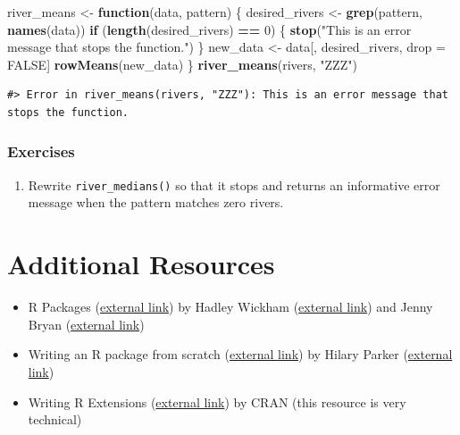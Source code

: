 \documentclass[
]{book}
\newenvironment{Shaded}{\begin{snugshade}}{\end{snugshade}}
\newcommand{\ControlFlowTok}[1]{\textcolor[rgb]{0.13,0.29,0.53}{\textbf{#1}}}
\newcommand{\DecValTok}[1]{\textcolor[rgb]{0.00,0.00,0.81}{#1}}
\newcommand{\KeywordTok}[1]{\textcolor[rgb]{0.13,0.29,0.53}{\textbf{#1}}}
\newcommand{\NormalTok}[1]{#1}
\newcommand{\OperatorTok}[1]{\textcolor[rgb]{0.81,0.36,0.00}{\textbf{#1}}}
\newcommand{\OtherTok}[1]{\textcolor[rgb]{0.56,0.35,0.01}{#1}}
\newcommand{\StringTok}[1]{\textcolor[rgb]{0.31,0.60,0.02}{#1}}
\providecommand{\tightlist}{%
  \setlength{\itemsep}{0pt}\setlength{\parskip}{0pt}}
\begin{document}
\begin{Shaded}
\begin{Highlighting}[]
\NormalTok{river_means <-}\StringTok{ }\ControlFlowTok{function}\NormalTok{(data, pattern) \{}
\NormalTok{  desired_rivers <-}\StringTok{ }\KeywordTok{grep}\NormalTok{(pattern, }\KeywordTok{names}\NormalTok{(data))}
  \ControlFlowTok{if}\NormalTok{ (}\KeywordTok{length}\NormalTok{(desired_rivers) }\OperatorTok{==}\StringTok{ }\DecValTok{0}\NormalTok{) \{}
    \KeywordTok{stop}\NormalTok{(}\StringTok{"This is an error message that stops the function."}\NormalTok{)}
\NormalTok{  \}}
\NormalTok{  new_data <-}\StringTok{ }\NormalTok{data[, desired_rivers, drop =}\StringTok{ }\OtherTok{FALSE}\NormalTok{]}
  \KeywordTok{rowMeans}\NormalTok{(new_data)}
\NormalTok{\}}
\KeywordTok{river_means}\NormalTok{(rivers, }\StringTok{"ZZZ"}\NormalTok{)}
\end{Highlighting}
\end{Shaded}

\begin{verbatim}
#> Error in river_means(rivers, "ZZZ"): This is an error message that stops the function.
\end{verbatim}

\hypertarget{ex-set6}{%
\subsubsection{Exercises}\label{ex-set6}}

\begin{enumerate}
\def\labelenumi{\arabic{enumi}.}
\tightlist
\item
  Rewrite \texttt{river\_medians()} so that it stops and returns an informative error message when the pattern matches zero rivers.
\end{enumerate}

\hypertarget{add-resources}{%
\section{Additional Resources}\label{add-resources}}

\begin{itemize}
\tightlist
\item
  R Packages (\href{https://r-pkgs.org/index.html}{external link}) by Hadley Wickham (\href{http://hadley.nz/}{external link}) and Jenny Bryan (\href{https://jennybryan.org/}{external link}) \citep{wickham2015r}
\item
  Writing an R package from scratch (\href{https://hilaryparker.com/2014/04/29/writing-an-r-package-from-scratch/}{external link}) by Hilary Parker (\href{https://hilaryparker.com/}{external link})
\item
  Writing R Extensions (\href{https://cran.r-project.org/doc/manuals/r-release/R-exts.html}{external link}) by CRAN (this resource is very technical)
\end{itemize}
\end{document}
